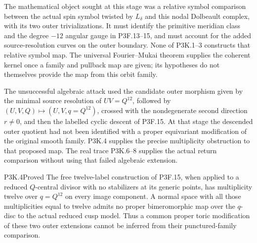 The mathematical object sought at this stage was a relative symbol comparison
between the actual spin symbol twisted by \(L_\delta\) and this
nodal Dolbeault complex, with its two outer trivializations.  It must
identify the primitive meridian class and the degree \(-12\) angular
gauge in P3F.13–15, and must account for the added source-resolution
curves on the outer boundary.  None of P3K.1–3 constructs that relative
symbol map.  The universal Fourier–Mukai theorem supplies the coherent
kernel once a family and pullback map are given; its hypotheses do
not themselves provide the map from this orbit family.

The unsuccessful algebraic attack used the candidate outer morphism
given by the minimal source
resolution of \(UV=Q^{12}\), followed by
\((U,V,Q)\mapsto(U,V,q=Q^{12})\), crossed with the nondegenerate second
direction \(r\ne0\), and then the labelled cyclic descent of P3F.15.
At that stage the descended outer quotient had not been identified
with a proper equivariant modification of the original smooth
family.  P3K.4 supplies the precise multiplicity obstruction to
that proposed map.  The real trace P3K.6–8 supplies the actual
return comparison without using that failed algebraic extension.

\begin{statement}{P3K.4}{Proved}
The free twelve-label construction of P3F.15, when applied to a
reduced \(Q\)-central divisor with no stabilizers at its generic
points, has multiplicity twelve over \(q=Q^{12}\) on every image
component.  A normal space with all those multiplicities equal to
twelve admits no proper bimeromorphic map over the \(q\)-disc to the
actual reduced cusp model.  Thus a common proper toric modification
of these two outer extensions cannot be inferred from their
punctured-family comparison.
\end{statement}

